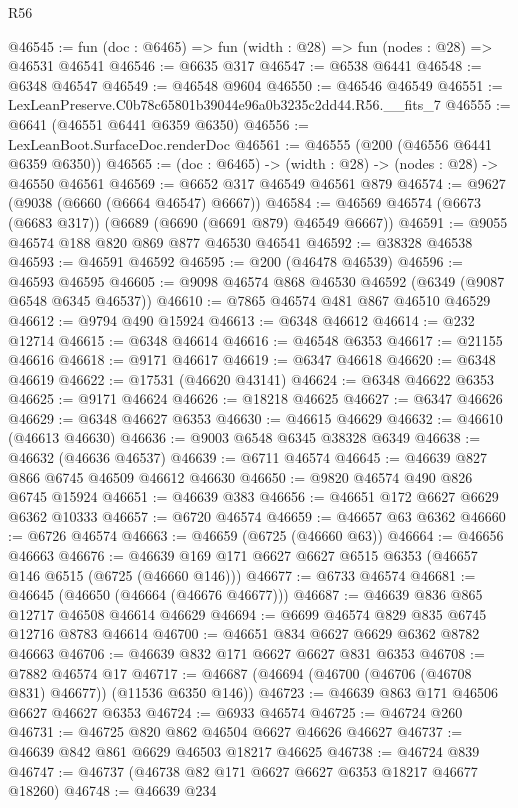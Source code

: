 \begin{lexlean}{R56}
\begin{coremodule}
@46545 := fun (doc : @6465) => fun (width : @28) => fun (nodes : @28) => @46531 @46541
@46546 := @6635 @317
@46547 := @6538 @6441
@46548 := @6348 @46547
@46549 := @46548 @9604
@46550 := @46546 @46549
@46551 := LexLeanPreserve.C0b78c65801b39044e96a0b3235c2dd44.R56.__fits_7
@46555 := @6641 (@46551 @6441 @6359 @6350)
@46556 := LexLeanBoot.SurfaceDoc.renderDoc
@46561 := @46555 (@200 (@46556 @6441 @6359 @6350))
@46565 := (doc : @6465) -> (width : @28) -> (nodes : @28) -> @46550 @46561
@46569 := @6652 @317 @46549 @46561 @879
@46574 := @9627 (@9038 (@6660 (@6664 @46547) @6667))
@46584 := @46569 @46574 (@6673 (@6683 @317)) (@6689 (@6690 (@6691 @879) @46549 @6667))
@46591 := @9055 @46574 @188 @820 @869 @877 @46530 @46541
@46592 := @38328 @46538
@46593 := @46591 @46592
@46595 := @200 (@46478 @46539)
@46596 := @46593 @46595
@46605 := @9098 @46574 @868 @46530 @46592 (@6349 (@9087 @6548 @6345 @46537))
@46610 := @7865 @46574 @481 @867 @46510 @46529
@46612 := @9794 @490 @15924
@46613 := @6348 @46612
@46614 := @232 @12714
@46615 := @6348 @46614
@46616 := @46548 @6353
@46617 := @21155 @46616
@46618 := @9171 @46617
@46619 := @6347 @46618
@46620 := @6348 @46619
@46622 := @17531 (@46620 @43141)
@46624 := @6348 @46622 @6353
@46625 := @9171 @46624
@46626 := @18218 @46625
@46627 := @6347 @46626
@46629 := @6348 @46627 @6353
@46630 := @46615 @46629
@46632 := @46610 (@46613 @46630)
@46636 := @9003 @6548 @6345 @38328 @6349
@46638 := @46632 (@46636 @46537)
@46639 := @6711 @46574
@46645 := @46639 @827 @866 @6745 @46509 @46612 @46630
@46650 := @9820 @46574 @490 @826 @6745 @15924
@46651 := @46639 @383
@46656 := @46651 @172 @6627 @6629 @6362 @10333
@46657 := @6720 @46574
@46659 := @46657 @63 @6362
@46660 := @6726 @46574
@46663 := @46659 (@6725 (@46660 @63))
@46664 := @46656 @46663
@46676 := @46639 @169 @171 @6627 @6627 @6515 @6353 (@46657 @146 @6515 (@6725 (@46660 @146)))
@46677 := @6733 @46574
@46681 := @46645 (@46650 (@46664 (@46676 @46677)))
@46687 := @46639 @836 @865 @12717 @46508 @46614 @46629
@46694 := @6699 @46574 @829 @835 @6745 @12716 @8783 @46614
@46700 := @46651 @834 @6627 @6629 @6362 @8782 @46663
@46706 := @46639 @832 @171 @6627 @6627 @831 @6353
@46708 := @7882 @46574 @17
@46717 := @46687 (@46694 (@46700 (@46706 (@46708 @831) @46677)) (@11536 @6350 @146))
@46723 := @46639 @863 @171 @46506 @6627 @46627 @6353
@46724 := @6933 @46574
@46725 := @46724 @260
@46731 := @46725 @820 @862 @46504 @6627 @46626 @46627
@46737 := @46639 @842 @861 @6629 @46503 @18217 @46625
@46738 := @46724 @839
@46747 := @46737 (@46738 @82 @171 @6627 @6627 @6353 @18217 @46677 @18260)
@46748 := @46639 @234

\end{coremodule}
\end{lexlean}
